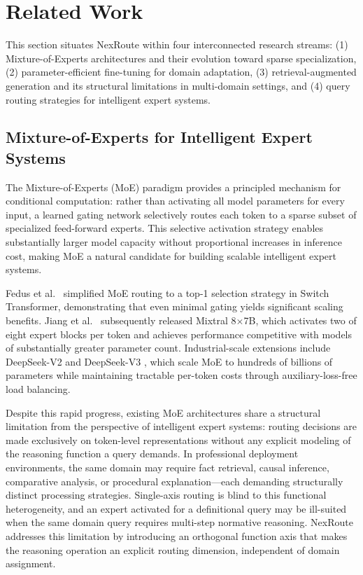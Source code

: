 \documentclass[a4paper,fleql]{cas-sc}
\begin{document}
\section{Related Work}
\label{sec:related}

This section situates NexRoute within four interconnected research streams:
(1) Mixture-of-Experts architectures and their evolution toward sparse
specialization, (2) parameter-efficient fine-tuning for domain adaptation,
(3) retrieval-augmented generation and its structural limitations in
multi-domain settings, and (4) query routing strategies for intelligent expert
systems.

\subsection{Mixture-of-Experts for Intelligent Expert Systems}
The Mixture-of-Experts (MoE) paradigm \citep{shazeer2017outrageously} provides
a principled mechanism for conditional computation: rather than activating all
model parameters for every input, a learned gating network selectively routes
each token to a sparse subset of specialized feed-forward experts. This
selective activation strategy enables substantially larger model capacity
without proportional increases in inference cost, making MoE a natural
candidate for building scalable intelligent expert systems.

Fedus et al.\ \citep{fedus2022switch} simplified MoE routing to a top-1
selection strategy in Switch Transformer, demonstrating that even minimal
gating yields significant scaling benefits. Jiang et al.\ \citep{jiang2024mixtral}
subsequently released Mixtral 8$\times$7B, which activates two of eight expert
blocks per token and achieves performance competitive with models of
substantially greater parameter count. Industrial-scale extensions include
DeepSeek-V2 \citep{deepseekai2024deepseekv2} and DeepSeek-V3
\citep{deepseekai2025deepseekv3}, which scale MoE to hundreds of billions of
parameters while maintaining tractable per-token costs through
auxiliary-loss-free load balancing.

Despite this rapid progress, existing MoE architectures share a structural
limitation from the perspective of intelligent expert systems: routing decisions
are made exclusively on token-level representations without any explicit
modeling of the reasoning function a query demands. In professional deployment
environments, the same domain may require fact retrieval, causal inference,
comparative analysis, or procedural explanation---each demanding structurally
distinct processing strategies. Single-axis routing is blind to this
functional heterogeneity, and an expert activated for a definitional query
may be ill-suited when the same domain query requires multi-step normative
reasoning. NexRoute addresses this limitation by introducing an orthogonal
function axis that makes the reasoning operation an explicit routing
dimension, independent of domain assignment.
\end{document}
